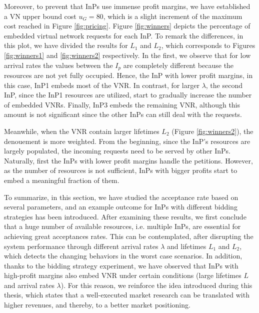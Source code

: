 Moreover, to prevent that InPs use immense profit margins, we have established a VN upper bound cost $u_G = 80$, which is a slight increment of the maximum cost reached in Figure \ref{fig:pricing}. Figure \ref{fig:winners} depicts the percentage of embedded virtual network requests for each InP. To remark the differences, in this plot, we have divided the results for $L_1$ and $L_2$, which corresponds to Figures \ref{fig:winners1} and \ref{fig:winners2} respectively. In the first, we observe that for low arrival rates the values between the $I_p$ are completely different because the resources are not yet fully occupied. Hence, the InP with lower profit margins, in this case, InP1 embeds most of the VNR. In contrast, for larger $\lambda$, the second InP, since the InP1 resources are utilized, start to gradually increase the number of embedded VNRs. Finally, InP3 embeds the remaining VNR, although this amount is not significant since the other InPs can still deal with the requests.

Meanwhile, when the VNR contain larger lifetimes $L_2$ (Figure \ref{fig:winners2}), the denouement is more weighted. From the beginning, since the InP's resources are largely populated, the incoming requests need to be served by other InPs. Naturally, first the InPs with lower profit margins handle the petitions. However, as the number of resources is not sufficient, InPs with bigger profits start to embed a meaningful fraction of them.

To summarize, in this section, we have studied the acceptance rate based on several parameters, and an example outcome for InPs with different bidding strategies has been introduced. After examining these results, we first conclude that a huge number of available resources, i.e. multiple InPs, are essential for achieving great acceptances rates. This can be contemplated, after disrupting the system performance through different arrival rates $\lambda$ and lifetimes $L_1$ and $L_2$, which detects the changing behaviors in the worst case scenarios. In addition, thanks to the bidding strategy experiment, we have observed that InPs with high-profit margins also embed VNR under certain conditions (large lifetimes $L$ and arrival rates $\lambda$). For this reason, we reinforce the idea introduced during this thesis, which states that a well-executed market research can be translated with higher revenues, and thereby, to a better market positioning.

